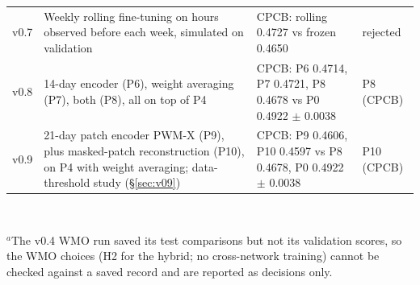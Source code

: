 \begin{table}[t]
\begin{tabular}{@{}lp{5.9cm}p{6.3cm}l@{}}
\addlinespace
v0.7 & Weekly rolling fine-tuning on hours observed before each week, simulated on validation &
CPCB: rolling 0.4727 vs frozen 0.4650 & rejected \\
\addlinespace
v0.8 & 14-day encoder (P6), weight averaging (P7), both (P8), all on top of P4 &
CPCB: P6 0.4714, P7 0.4721, P8 0.4678 vs P0 0.4922 $\pm$ 0.0038 & P8 (CPCB) \\
\addlinespace
v0.9 & 21-day patch encoder PWM-X (P9), plus masked-patch reconstruction (P10), on P4 with weight averaging;
data-threshold study (\S\ref{sec:v09}) &
CPCB: P9 0.4606, P10 0.4597 vs P8 0.4678, P0 0.4922 $\pm$ 0.0038 & P10 (CPCB) \\
\bottomrule
\end{tabular}\\[2pt]
\parbox{\textwidth}{\footnotesize $^{a}$The v0.4 WMO run saved its test comparisons but not its validation scores, so the
WMO choices (H2 for the hybrid; no cross-network training) cannot be checked against a saved record and are reported as
decisions only.}
\end{table}

